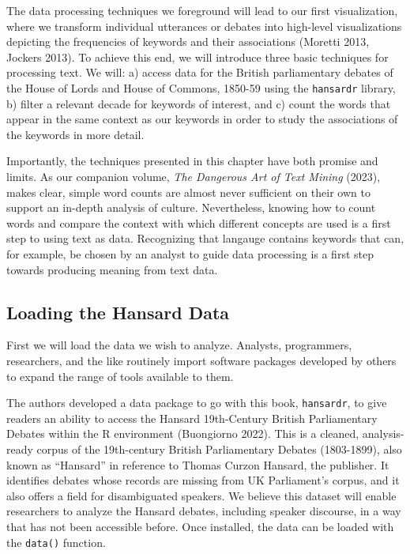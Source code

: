 \documentclass[
]{article}
\begin{document}
The data processing techniques we foreground will lead to our first
visualization, where we transform individual utterances or debates into
high-level visualizations depicting the frequencies of keywords and
their associations (Moretti 2013, Jockers 2013). To achieve this end, we
will introduce three basic techniques for processing text. We will: a)
access data for the British parliamentary debates of the House of Lords
and House of Commons, 1850-59 using the \texttt{hansardr} library, b)
filter a relevant decade for keywords of interest, and c) count the
words that appear in the same context as our keywords in order to study
the associations of the keywords in more detail.

Importantly, the techniques presented in this chapter have both promise
and limits. As our companion volume, \emph{The Dangerous Art of Text
Mining} (2023), makes clear, simple word counts are almost never
sufficient on their own to support an in-depth analysis of culture.
Nevertheless, knowing how to count words and compare the context with
which different concepts are used is a first step to using text as data.
Recognizing that langauge contains keywords that can, for example, be
chosen by an analyst to guide data processing is a first step towards
producing meaning from text data.

\subsection{Loading the Hansard Data}\label{loading-the-hansard-data}

First we will load the data we wish to analyze. Analysts, programmers,
researchers, and the like routinely import software packages developed
by others to expand the range of tools available to them.

The authors developed a data package to go with this book,
\texttt{hansardr}, to give readers an ability to access the Hansard
19th-Century British Parliamentary Debates within the R environment
(Buongiorno 2022). This is a cleaned, analysis-ready corpus of the
19th-century British Parliamentary Debates (1803-1899), also known as
``Hansard'' in reference to Thomas Curzon Hansard, the publisher. It
identifies debates whose records are missing from UK Parliament's
corpus, and it also offers a field for disambiguated speakers. We
believe this dataset will enable researchers to analyze the Hansard
debates, including speaker discourse, in a way that has not been
accessible before. Once installed, the data can be loaded with the
\texttt{data()} function.
\end{document}
